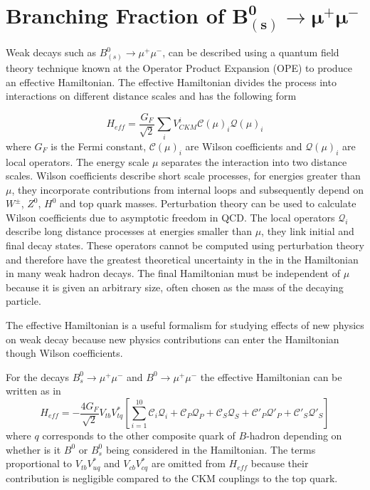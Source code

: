 \section{Branching Fraction of $\boldsymbol{B_{(s)}^{0} \to \mu^{+} \mu^{-}}$ }

Weak decays such as $B_{(s)}^{0} \to \mu^{+} \mu^{-}$, can be described using a quantum field theory technique known at the Operator Product Expansion (OPE) \cite{Wilson:1969zs,Wilson:1972ee} to produce an effective Hamiltonian. The effective Hamiltonian 
divides the process into interactions on different distance scales and has the following form \cite{Buras:1998raa}

$$ H_{\textit{eff}} = \frac{G_{F}}{\sqrt{2}} \sum_{i} V^{i}_{CKM}\mathcal{C}(\mu)_{i} \mathcal{Q}(\mu)_{i} $$
where $G_{F}$ is the Fermi constant, $\mathcal{C}(\mu)_i$ are Wilson coefficients and $\mathcal{Q}(\mu)_i$ are local operators.
The energy scale $\mu$ separates the interaction into two distance scales.  Wilson coefficients describe short scale processes, for energies greater than $\mu$, they incorporate contributions from internal loops and subsequently depend on $W^{\pm}$, $Z^{0}$,
$H^{0}$ and top quark masses. Perturbation theory can be used to calculate Wilson coefficients due to asymptotic freedom in QCD. The local operators $\mathcal{Q}_{i}$ describe long distance processes at energies smaller than $\mu$, they link initial and final decay states. 
These operators cannot be computed using perturbation theory and therefore have the greatest theoretical uncertainty in the in the Hamiltonian in many weak hadron decays.
The final Hamiltonian must be independent of $\mu$ because it is given an arbitrary size, often chosen as the mass of the decaying particle.

The effective Hamiltonian is a useful formalism for studying effects of new physics on weak decay because new physics contributions can enter the Hamiltonian though Wilson coefficients. 

For the decays $B_{s}^{0} \to \mu^{+} \mu^{-}$ and $B^{0} \to \mu^{+} \mu^{-}$ the effective Hamiltonian can be written as in \cite{Bobeth:2001sq}
\begin{equation} \label{eq:h_eff}
 H_{\textit{eff}} = -\frac{4G_{F}}{\sqrt{2} } V_{tb}V_{tq}^{*} \left [  \sum_{i=1}^{10}\mathcal{C}_{i} \mathcal{Q}_{i} + \mathcal{C}_{P} \mathcal{Q}_{P}+\mathcal{C}_{S} \mathcal{Q}_{S} + \mathcal{C}'_{P} \mathcal{Q}'_{P}+\mathcal{C}'_{S} \mathcal{Q}'_{S}\right ]
\end{equation} 
where $q$ corresponds to the other composite quark of $B$-hadron depending on whether is it $B^{0}$ or $B_{s}^{0}$ being considered in the Hamiltonian. The terms proportional to $ V_{tb}V_{uq}^{*}$ 
and  $V_{cb}V_{cq}^{*}$ are omitted from $H_{\textit{eff}}$ because their contribution is negligible compared to the CKM couplings to the top quark.

